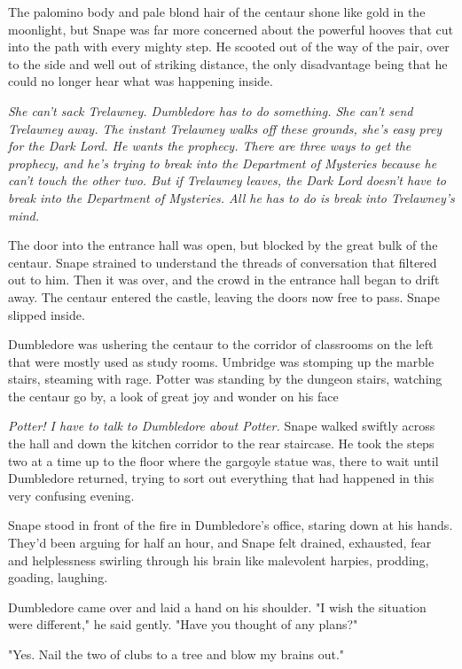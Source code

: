 The palomino body and pale blond hair of the centaur shone like gold in the moonlight, but Snape was far more concerned about the powerful hooves that cut into the path with every mighty step. He scooted out of the way of the pair, over to the side and well out of striking distance, the only disadvantage being that he could no longer hear what was happening inside.

\emph{She can't sack Trelawney. Dumbledore has to do something. She can't send Trelawney away. The instant Trelawney walks off these grounds, she's easy prey for the Dark Lord. He wants the prophecy. There are three ways to get the prophecy, and he's trying to break into the Department of Mysteries because he can't touch the other two. But if Trelawney leaves, the Dark Lord doesn't have to break into the Department of Mysteries. All he has to do is break into Trelawney's mind.}

The door into the entrance hall was open, but blocked by the great bulk of the centaur. Snape strained to understand the threads of conversation that filtered out to him. Then it was over, and the crowd in the entrance hall began to drift away. The centaur entered the castle, leaving the doors now free to pass. Snape slipped inside.

Dumbledore was ushering the centaur to the corridor of classrooms on the left that were mostly used as study rooms. Umbridge was stomping up the marble stairs, steaming with rage. Potter was standing by the dungeon stairs, watching the centaur go by, a look of great joy and wonder on his face{\el}

\emph{Potter! I have to talk to Dumbledore about Potter.} Snape walked swiftly across the hall and down the kitchen corridor to the rear staircase. He took the steps two at a time up to the floor where the gargoyle statue was, there to wait until Dumbledore returned, trying to sort out everything that had happened in this very confusing evening.

\sbreak

Snape stood in front of the fire in Dumbledore's office, staring down at his hands. They'd been arguing for half an hour, and Snape felt drained, exhausted, fear and helplessness swirling through his brain like malevolent harpies, prodding, goading, laughing.

Dumbledore came over and laid a hand on his shoulder. "I wish the situation were different," he said gently. "Have you thought of any plans?"

"Yes. Nail the two of clubs to a tree and blow my brains out."

